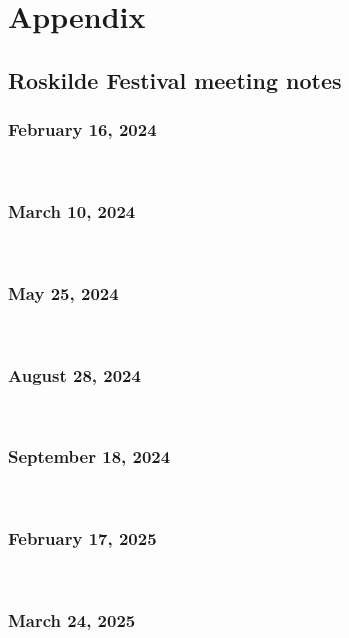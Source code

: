 \chapter{Appendix}

\section{Roskilde Festival meeting notes}
\label{appendix:rf-meeting-notes}

\subsection{February 16, 2024}
\


\subsection{March 10, 2024}
\


\subsection{May 25, 2024}
\


\subsection{August 28, 2024}
\


\subsection{September 18, 2024}
\


\subsection{February 17, 2025}
\


\subsection{March 24, 2025}
\


